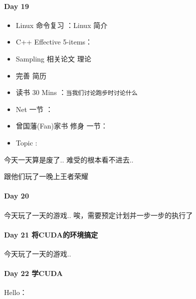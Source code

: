 \documentclass[UTF8,a4paper,8pt]{ctexart}
\begin{document}
 	 \paragraph{Day 19      \quad     }
 	 
	 	 \begin{itemize}[itemindent = 1em]
	 	 	\renewcommand\labelitemi{\makebox[0pt][l]{$\square$}\hspace{1em}} 
	 	 	\renewcommand\labelitemi{\makebox[0pt][l]{$\square$}\raisebox{.15ex}{\hspace{0.1em}$\checkmark$}}	 	
	 	 	\item   Linux 命令复习 ：Linux 简介
	 	 	\item   C++ Effective 5-items：
	 	 	\item   Sampling  相关论文 理论
	 	 	\item   完善 简历
	 	 	
	 	 	\renewcommand\labelitemi{\makebox[0pt][l]{$\square$}\hspace{1em}} 
	 	 	\item   读书  30 Mins	：\verb|当我们讨论跑步时讨论什么|
	 	 	\item   Net 一节 ：	
	 	 	
	 	 	\renewcommand\labelitemi{\makebox[0pt][l]{$\square$}\raisebox{.15ex}{\hspace{0.1em}$\checkmark$}}
	 	 	\item   曾国藩(Fan)家书 修身 一节：
	 	 	\item   Topic : 
	 	 \end{itemize}
		 	 今天一天算是废了.. 难受的根本看不进去..
	 	 
		 	 跟他们玩了一晚上王者荣耀
 	 \paragraph{Day 20      \quad     }
		 	 今天玩了一天的游戏.. 唉，需要预定计划并一步一步的执行了
 	 
	 	 
 	 \paragraph{Day 21  将CUDA的环境搞定    \quad     }
		 	 今天玩了一天的游戏..
		 	 
 	 \paragraph{Day 22  学CUDA   \quad     }Hello：
 	 
\end{document}
